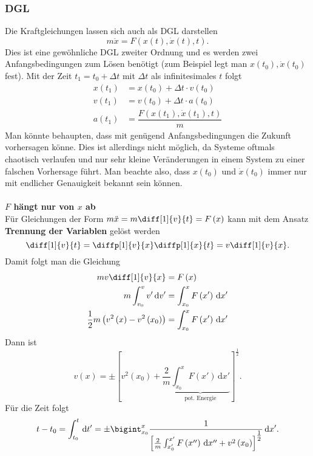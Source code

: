 \documentclass[a4paper,12pt]{article}
\newcommand{\td}{\,\text{d}}
\numberwithin{equation}{section}
\begin{document}
\subsubsection{DGL}
Die Kraftgleichungen lassen sich auch als DGL darstellen
\[ 
        m\ddot{x}=F\left(x\left(t\right),\dot{x}\left(t\right),t\right)
.\] 
Dies ist eine gewöhnliche DGL zweiter Ordnung und es werden zwei Anfangsbedingungen zum Lösen benötigt (zum Beispiel legt man $x\left(t_0\right),\dot{x}\left(t_0\right)$ fest). Mit der Zeit $t_1=t_0+\Delta t$ mit $\Delta t$ als infinitesimales $t$ folgt
\begin{align*}
        x\left(t_1\right)&=x\left(t_0\right)+\Delta t\cdot v\left(t_0\right)\\
        v\left(t_1\right)&=v\left(t_0\right)+\Delta t\cdot a\left(t_0\right)\\
        a\left(t_1\right)&=\dfrac{F\left(x\left(t_1\right),\dot{x}\left(t_1\right),t\right)}{m}
\end{align*}
Man könnte behaupten, dass mit genügend Anfangsbedingungen die Zukunft \glqq vorhersagen\grqq{} könne. Dies ist allerdings nicht möglich, da Systeme oftmals chaotisch verlaufen und nur sehr kleine Veränderungen in einem System zu einer falschen \glqq Vorhersage\grqq{} führt. Man beachte also, dass $x\left(t_0\right)$ und $\dot{x}\left(t_0\right)$ immer nur mit endlicher Genauigkeit bekannt sein können.
\\\hfill\\\textbf{$F$ hängt nur von $x$ ab}\\ 
Für Gleichungen der Form $m\ddot{x}=m\diff[1]{v}{t}=F\left(x\right)$ kann mit dem Ansatz \textbf{Trennung der Variablen} gelöst werden
\[ 
        \diff[1]{v}{t}=\diffp[1]{v}{x}\diffp[1]{x}{t}=v \diff[1]{v}{x}
.\] 
Damit folgt man die Gleichung
\begin{align*}
        mv \diff[1]{v}{x}&=F\left(x\right)\\
        m\int_{v_0}^{v}v'\td v'&=\int_{x_0}^{x}F\left(x'\right)\td x'\\
        \dfrac{1}{2}m\left(v^2\left(x\right)-v^2\left(x_0\right)\right)&=\int_{x_0}^{x}F\left(x'\right)\td x'
\end{align*}
Dann ist
\[ 
        v\left(x\right)=\pm\left[v^2\left(x_0\right)+\dfrac{2}{m}\underbrace{\int_{x_0}^{x}F\left(x'\right)\td x'}_{\,\text{pot. Energie}\,}\right]^{\tfrac{1}{2}}
.\] 
Für die Zeit folgt
\[ 
        t-t_0=\int_{t_0}^{t}\td t'=\pm\bigint_{x_0}^{x}\dfrac{1}{\left[\tfrac{2}{m}\int_{x_0'}^{x'}F\left(x''\right)\td x''+v^2\left(x_0\right)\right]^{\tfrac{1}{2} }}\td x'
.\] 
\end{document}
